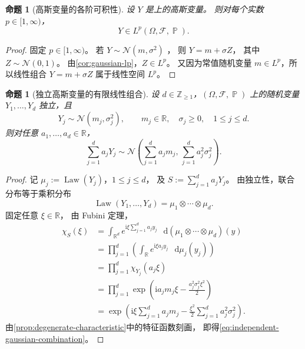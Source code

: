 \documentclass[UTF8,11pt,a4paper,oneside,fontset=fandol]{ctexrep}
\numberwithin{equation}{section}
\theoremstyle{plain}
\newtheorem{proposition}[theorem]{命题}
\theoremstyle{definition}
\theoremstyle{remark}
\newcommand{\Z}{\mathbb{Z}}
\newcommand{\R}{\mathbb{R}}
\newcommand{\F}{\mathcal{F}}
\DeclareMathOperator{\Prob}{\mathbb{P}}
\DeclareMathOperator{\Law}{Law}
\newcommand{\dd}{\mathop{}\!\mathrm{d}}
\begin{document}
\begin{samepage}
\begin{proposition}[高斯变量的各阶可积性]
\label{prop:gaussian-all-lp}
设 $Y$ 是上的高斯变量。
则对每个实数 $p\in[1,\infty)$，
\[
  Y\in L^p(\Omega,\F,\Prob).
\]
\end{proposition}

\begin{proof}
固定 $p\in[1,\infty)$。
若 $Y\sim\mathcal{N}(m,\sigma^2)$ ，
则 $Y=m+\sigma Z$，
其中 $Z\sim\mathcal{N}(0,1)$。
由\cref{cor:gaussian-lp}，$Z\in L^p$。
又因为常值随机变量 $m\in L^p$，所以线性组合 $Y=m+\sigma Z$ 属于线性空间 $L^p$。
\end{proof}
\end{samepage}

\begin{proposition}[独立高斯变量的有限线性组合]
\label{prop:independent-gaussian-combination}
设 $d\in\Z_{\ge1}$，$(\Omega,\F,\Prob)$ 上的随机变量
$Y_1,\ldots,Y_d$ 独立，且
\[
  Y_j\sim\mathcal{N}(m_j,\sigma_j^2),
  \qquad m_j\in\R,\quad \sigma_j\ge0,\quad 1\le j\le d.
\]
则对任意 $a_1,\ldots,a_d\in\R$，
\begin{equation}
  \label{eq:independent-gaussian-combination}
  \sum_{j=1}^{d}a_jY_j
  \sim\mathcal{N}\!\left(
    \sum_{j=1}^{d}a_jm_j,\,
    \sum_{j=1}^{d}a_j^2\sigma_j^2
  \right).
\end{equation}
\end{proposition}

\begin{proof}
记 $\mu_j:=\Law(Y_j)$，$1\le j\le d$，
及 $S:=\sum_{j=1}^{d}a_jY_j$。
由独立性，联合分布等于乘积分布
\[
  \Law(Y_1,\ldots,Y_d)=\mu_1\otimes\cdots\otimes\mu_d.
\]
固定任意 $\xi\in\R$，
由 Fubini 定理，
\begin{align*}
  \chi_S(\xi)
  &=\int_{\R^d}e^{\mathrm{i}\xi\sum_{j=1}^{d}a_jy_j}\,
      \dd(\mu_1\otimes\cdots\otimes\mu_d)(y)\\
  &=\prod_{j=1}^{d}
      \left(\int_{\R}e^{\mathrm{i}\xi a_jy_j}\,\dd\mu_j(y_j)\right)\\
  &=\prod_{j=1}^{d}\chi_{Y_j}(a_j\xi)\\
  &=\prod_{j=1}^{d}
      \exp\!\left(\mathrm{i}a_jm_j\xi
                   -\frac{a_j^2\sigma_j^2\xi^2}{2}\right)\\
  &=\exp\!\left(
      \mathrm{i}\xi\sum_{j=1}^{d}a_jm_j
      -\frac{\xi^2}{2}\sum_{j=1}^{d}a_j^2\sigma_j^2
    \right).
\end{align*}
由\cref{prop:degenerate-characteristic}中的特征函数刻画，
即得\cref{eq:independent-gaussian-combination}。
\end{proof}
\end{document}
